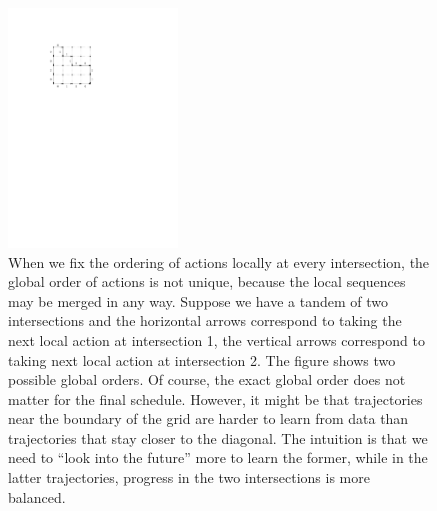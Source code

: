 \documentclass[a4paper]{article}
\theoremstyle{definition}
\theoremstyle{plain}
\begin{document}
\begin{figure}
  \centering
  \includegraphics[width=0.4\textwidth]{figures/network/solution_equivalence}
  \caption{When we fix the ordering of actions locally at every intersection,
    the global order of actions is not unique, because the local sequences may
    be merged in any way. Suppose we have a tandem of two intersections and the
    horizontal arrows correspond to taking the next local action at intersection
    1, the vertical arrows correspond to taking next local action at
    intersection 2. The figure shows two possible global orders. Of course, the
    exact global order does not matter for the final schedule. However, it might
    be that trajectories near the boundary of the grid are harder to learn from
    data than trajectories that stay closer to the diagonal. The intuition is
    that we need to ``look into the future'' more to learn the former, while in
    the latter trajectories, progress in the two intersections is more balanced.}
  \label{fig:solution_equivalence}
\end{figure}
\end{document}
